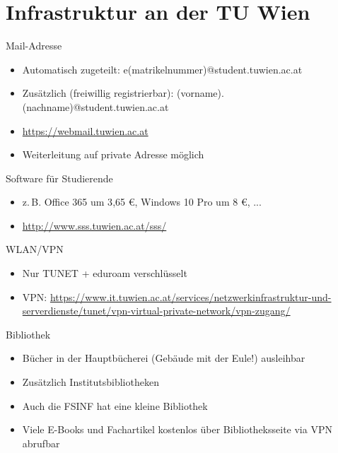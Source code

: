 \documentclass{beamer}
\begin{document}
\section{Infrastruktur an der TU Wien}

\begin{frame}{Mail-Adresse}
    \begin{itemize}
        \item Automatisch zugeteilt: e(matrikelnummer)@student.tuwien.ac.at
        \item Zusätzlich (freiwillig registrierbar): (vorname).(nachname)@student.tuwien.ac.at
        \item \url{https://webmail.tuwien.ac.at}
        \item Weiterleitung auf private Adresse möglich
    \end{itemize}
\end{frame}

\begin{frame}{Software für Studierende}
    \begin{itemize}
        \item z.\,B. Office 365 um 3{,}65 €, Windows 10 Pro um 8 €, ...
        \item \url{http://www.sss.tuwien.ac.at/sss/}
    \end{itemize}
\end{frame}

\begin{frame}{WLAN/VPN}
    \begin{itemize}
        \item Nur TUNET + eduroam verschlüsselt
        \item VPN: \url{https://www.it.tuwien.ac.at/services/netzwerkinfrastruktur-und-serverdienste/tunet/vpn-virtual-private-network/vpn-zugang/}
    \end{itemize}
\end{frame}

\begin{frame}{Bibliothek}
    \begin{itemize}
        \item Bücher in der Hauptbücherei (Gebäude mit der Eule!) ausleihbar
        \item Zusätzlich Institutsbibliotheken
        \item Auch die FSINF hat eine kleine Bibliothek
        \item Viele E-Books und Fachartikel kostenlos über Bibliotheksseite via VPN
            abrufbar
    \end{itemize}
\end{frame}
\end{document}
